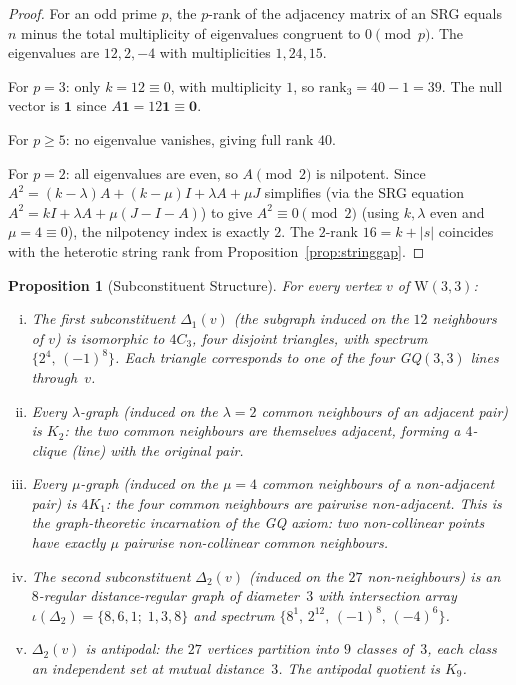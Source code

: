 \documentclass[12pt,a4paper]{article}
\newtheorem{proposition}[theorem]{Proposition}
\newcommand{\W}{\mathrm{W}(3,3)}
\begin{document}
\begin{proof}
For an odd prime $p$, the $p$-rank of the adjacency matrix of an SRG equals
$n$ minus the total multiplicity of eigenvalues congruent to $0 \pmod{p}$.
The eigenvalues are $12, 2, -4$ with multiplicities $1, 24, 15$.

For $p = 3$: only $k = 12 \equiv 0$, with multiplicity $1$, so
$\mathrm{rank}_3 = 40 - 1 = 39$.  The null vector is $\mathbf{1}$ since
$A\mathbf{1} = 12\mathbf{1} \equiv \mathbf{0}$.

For $p \ge 5$: no eigenvalue vanishes, giving full rank $40$.

For $p = 2$: all eigenvalues are even, so $A \pmod{2}$ is nilpotent.
Since $A^2 = (k{-}\lambda)A + (k{-}\mu)I + \lambda A + \mu J$
simplifies (via the SRG equation $A^2 = kI + \lambda A + \mu(J - I - A)$) to give
$A^2 \equiv 0 \pmod{2}$ (using $k, \lambda$ even and $\mu = 4 \equiv 0$),
the nilpotency index is exactly $2$.  The $2$-rank $16 = k + |s|$
coincides with the heterotic string rank from
Proposition~\ref{prop:stringgap}.
\end{proof}


\begin{proposition}[Subconstituent Structure]\label{prop:subconstituents}
For every vertex $v$ of $\W$:
\begin{enumerate}[(i)]
  \item The \emph{first subconstituent} $\Delta_1(v)$
        (the subgraph induced on the $12$ neighbours of $v$)
        is isomorphic to $4 C_3$, four disjoint triangles,
        with spectrum $\{2^4,\,(-1)^8\}$.
        Each triangle corresponds to one of the four GQ$(3,3)$ lines
        through~$v$.
  \item Every \emph{$\lambda$-graph}
        (induced on the $\lambda = 2$ common neighbours of an adjacent pair)
        is $K_2$: the two common neighbours are themselves adjacent,
        forming a $4$-clique (line) with the original pair.
  \item Every \emph{$\mu$-graph}
        (induced on the $\mu = 4$ common neighbours of a non-adjacent pair)
        is $4 K_1$: the four common neighbours are pairwise non-adjacent.
        This is the graph-theoretic incarnation of the GQ axiom:
        two non-collinear points have exactly $\mu$ pairwise non-collinear
        common neighbours.
  \item The \emph{second subconstituent} $\Delta_2(v)$
        (induced on the $27$ non-neighbours) is an $8$-regular
        distance-regular graph of diameter~$3$ with
        intersection array $\iota(\Delta_2) = \{8,6,1;\;1,3,8\}$
        and spectrum $\{8^1,\,2^{12},\,(-1)^8,\,(-4)^6\}$.
  \item $\Delta_2(v)$ is \emph{antipodal}: the $27$ vertices partition
        into $9$ classes of~$3$, each class an independent set
        at mutual distance~$3$.  The antipodal quotient is $K_9$.
\end{enumerate}
\end{proposition}
\end{document}
